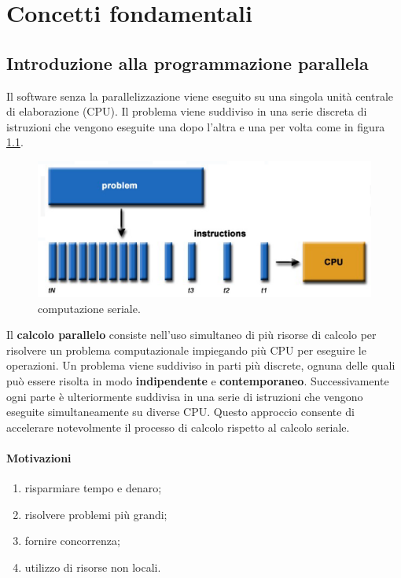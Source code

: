 \chapter{Concetti fondamentali}
\section{Introduzione alla programmazione parallela}
Il software senza la parallelizzazione viene eseguito su una singola unità centrale di elaborazione (CPU). Il problema viene suddiviso in una serie discreta di istruzioni che vengono eseguite una dopo l'altra e una per volta come in figura \ref{fig:serial-computation}.

\begin{figure}[th]
	\centering
	\includegraphics[width=0.8\linewidth]{img/serial-computation}
	\caption{computazione seriale.}
	\label{fig:serial-computation}
\end{figure}

Il \textbf{calcolo parallelo} consiste nell'uso simultaneo di più risorse di calcolo per risolvere un problema computazionale impiegando più CPU per eseguire le operazioni. Un problema viene suddiviso in parti più discrete, ognuna delle quali può essere risolta in modo \textbf{indipendente} e \textbf{contemporaneo}. Successivamente ogni parte è ulteriormente suddivisa in una serie di istruzioni che vengono eseguite simultaneamente su diverse CPU. Questo approccio consente di accelerare notevolmente il processo di calcolo rispetto al calcolo seriale.
\subsubsection*{Motivazioni}
\begin{enumerate}
	\item risparmiare tempo e denaro;
	\item risolvere problemi più grandi;
	\item fornire concorrenza;
	\item utilizzo di risorse non locali.
\end{enumerate}
